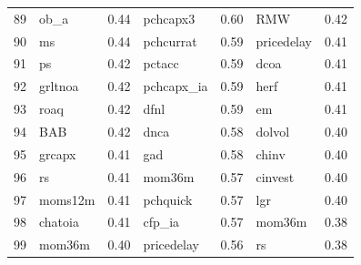 \begin{footnotesize}
\begin{longtable}{rlc|lc|lc}
		89                        & ob\_a                       & 0.44                          & pchcapx3                    & 0.60                          & RMW                               & 0.42           \\
		90                        & ms                          & 0.44                          & pchcurrat                   & 0.59                          & pricedelay                        & 0.41           \\
		91                        & ps                          & 0.42                          & pctacc                      & 0.59                          & dcoa                              & 0.41           \\
		92                        & grltnoa                     & 0.42                          & pchcapx\_ia                 & 0.59                          & herf                              & 0.41           \\
		93                        & roaq                        & 0.42                          & dfnl                        & 0.59                          & em                                & 0.41           \\
		94                        & BAB                         & 0.42                          & dnca                        & 0.58                          & dolvol                            & 0.40           \\
		95                        & grcapx                      & 0.41                          & gad                         & 0.58                          & chinv                             & 0.40           \\
		96                        & rs                          & 0.41                          & mom36m                      & 0.57                          & cinvest                           & 0.40           \\
		97                        & moms12m                     & 0.41                          & pchquick                    & 0.57                          & lgr                               & 0.40           \\
		98                        & chatoia                     & 0.41                          & cfp\_ia                     & 0.57                          & mom36m                            & 0.38           \\
		99                        & mom36m                      & 0.40                          & pricedelay                  & 0.56                          & rs                                & 0.38           \\

\end{longtable}
\end{footnotesize}
